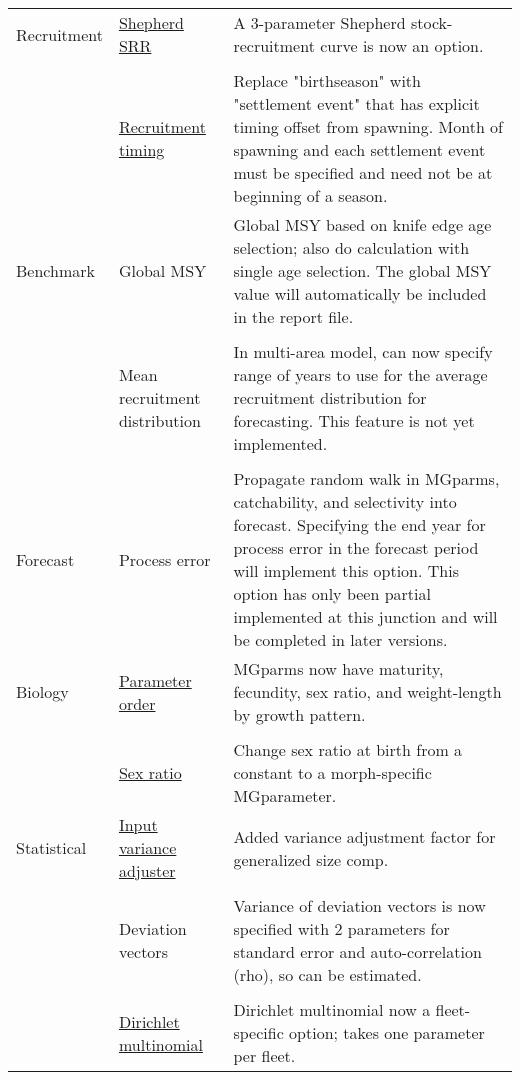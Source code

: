 \begin{center}
\begin{longtable}{p{2cm} p{3cm} p{10cm}}
				\hline
				Recruitment
					& \hyperlink{Shepherd}{Shepherd SRR} & 
						A 3-parameter Shepherd stock-recruitment curve is now an option.\\
					\\
					& \hyperlink{RecrTiming}{Recruitment timing} & 
						Replace "birthseason" with "settlement event" that has explicit timing offset from spawning.  Month of spawning and each settlement event must be specified and need not be at beginning of a season.\\
				\hline
				Benchmark 
					& Global MSY &  
						Global MSY based on knife edge age selection; also do calculation with single age selection. The global MSY value will automatically be included in the report file.\\
				  \\					
					& Mean recruitment distribution & 
						In multi-area model, can now specify range of years to use for the average recruitment distribution for forecasting. This feature is not yet implemented. \\
				  \\
				\hline
				Forecast & 
					Process error & 
						Propagate random walk in MGparms, catchability, and selectivity into forecast. Specifying the end year for process error in the forecast period will implement this option.  This option has only been partial implemented at this junction and will be completed in later versions.\\
				\hline
				Biology 
					& \hyperlink{MGorder}{Parameter order} & 
						MGparms now have maturity, fecundity, sex ratio, and weight-length by growth pattern.\\
				  \\						
				    & \hyperlink{SexRatio}{Sex ratio} & 
					    Change sex ratio at birth from a constant to a morph-specific MGparameter. \\
				Statistical 
					& \hyperlink{GcompVar}{Input variance adjuster} & 
						Added variance adjustment factor for generalized size comp. \\
				  \\						
					& Deviation vectors & 
						Variance of deviation vectors is now specified with 2 parameters for standard error and auto-correlation (rho), so can be estimated.\\
				  \\						
					& \hyperlink{Dirichlet}{Dirichlet multinomial} & 
						Dirichlet multinomial now a fleet-specific option; takes one parameter per fleet. \\

\end{longtable}
\end{center}
